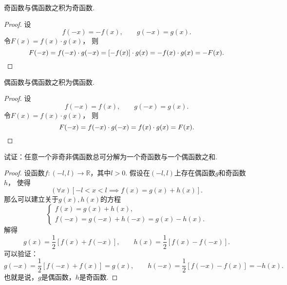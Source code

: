 \begin{property}
奇函数与偶函数之积为奇函数.
\begin{proof}
设\begin{equation*}
	f(-x) = -f(x),
	\qquad
	g(-x) = g(x).
\end{equation*}
令\(F(x) = f(x) \cdot g(x)\)，
则\begin{equation*}
	F(-x) = f(-x) \cdot g(-x)
	= [-f(x)] \cdot g(x)
	= - f(x) \cdot g(x)
	= - F(x).
	\qedhere
\end{equation*}
\end{proof}
\end{property}

\begin{property}
偶函数与偶函数之积为偶函数.
\begin{proof}
设\begin{equation*}
	f(-x) = f(x),
	\qquad
	g(-x) = g(x).
\end{equation*}
令\(F(x) = f(x) \cdot g(x)\)，
则\begin{equation*}
	F(-x) = f(-x) \cdot g(-x)
	= f(x) \cdot g(x)
	= F(x).
	\qedhere
\end{equation*}
\end{proof}
\end{property}

\begin{example}\label{example:函数.任一函数可拆为奇偶函数之和}
试证：任意一个非奇非偶函数总可分解为一个奇函数与一个偶函数之和.
\begin{proof}
设函数\(f\colon(-l,l)\to\mathbb{R}\)，其中\(l>0\).
假设在\((-l,l)\)上存在偶函数\(g\)和奇函数\(h\)，
使得\begin{equation*}
	(\forall x)
	[-l<x<l \implies f(x) = g(x)+h(x)].
\end{equation*}
那么可以建立关于\(g(x),h(x)\)的方程\begin{equation*}
	\left\{ \begin{array}{l}
		f(x) = g(x) + h(x), \\
		f(-x) = g(-x) + h(-x) = g(x) - h(x).
	\end{array} \right.
\end{equation*}
解得\begin{equation*}
	g(x) = \frac12 [f(x) + f(-x)], \qquad
	h(x) = \frac12 [f(x) - f(-x)].
\end{equation*}
可以验证：\begin{equation*}
	g(-x) = \frac12 [f(-x) + f(x)] = g(x), \qquad
	h(-x) = \frac12 [f(-x) - f(x)] = -h(x).
\end{equation*}
也就是说，\(g\)是偶函数，\(h\)是奇函数.
\end{proof}
\end{example}

